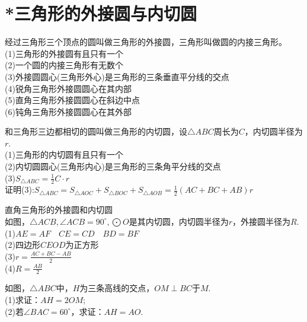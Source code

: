 \section{*三角形的外接圆与内切圆}
\begin{theorem}
    经过三角形三个顶点的圆叫做三角形的外接圆，三角形叫做圆的内接三角形。\\
    (1)三角形的外接圆有且只有一个 \\
    (2)一个圆的内接三角形有无数个 \\
    (3)外接圆圆心(三角形外心)是三角形的三条垂直平分线的交点 \\
    (4)锐角三角形外接圆圆心在其内部 \\
    (5)直角三角形外接圆圆心在斜边中点 \\
    (6)钝角三角形外接圆圆心在其外部
\end{theorem}
\begin{theorem}
    和三角形三边都相切的圆叫做三角形的内切圆，设$\triangle ABC$周长为$C$，内切圆半径为$r$.\\
    (1)三角形的内切圆有且只有一个 \\
    (2)内切圆圆心(三角形内心)是三角形的三条角平分线的交点 \\
    (3)$S_{\triangle ABC}=\frac{1}{2}C·r$ \\
    证明(3):$S_{\triangle ABC}=S_{\triangle AOC}+S_{\triangle BOC}+S_{\triangle AOB}=\frac{1}{2}(AC+BC+AB)r$
\end{theorem}
\begin{theorem}
    直角三角形的外接圆和内切圆 \\
    如图，$\triangle ACB,\angle ACB=90^\circ,\bigodot O$是其内切圆，内切圆半径为$r$，外接圆半径为$R$.\\
    (1)$AE=AF\quad  CE=CD\quad BD=BF$ \\
    (2)四边形$CEOD$为正方形 \\
    (3)$r=\frac{AC+BC-AB}{2}$ \\
    (4)$R=\frac{AB}{2}$
\end{theorem}
\begin{problem}
如图，$\triangle ABC$中，$H$为三条高线的交点，$OM\perp BC$于$M$. \\
(1)求证：$AH=2OM$; \\
(2)若$\angle BAC=60^\circ$，求证：$AH=AO$.
\end{problem}
\clearpage
